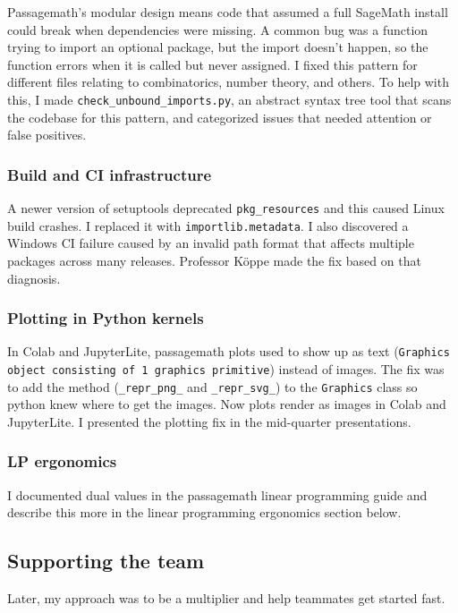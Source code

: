 \documentclass[10pt]{article}
\begin{document}
Passagemath's modular design means code that assumed a full SageMath install could break when dependencies were missing. A common bug was a function trying to import an optional package, but the import doesn't happen, so the function errors when it is called but never assigned. I fixed this pattern for different files relating to combinatorics, number theory, and others. To help with this, I made \texttt{check\_unbound\_imports.py}, an abstract syntax tree tool that scans the codebase for this pattern, and categorized issues that needed attention or false positives.

\subsubsection{Build and CI infrastructure}

A newer version of setuptools deprecated \texttt{pkg\_resources} and this caused Linux build crashes. I replaced it with \texttt{importlib.metadata}. I also discovered a Windows CI failure caused by an invalid path format that affects multiple packages across many releases. Professor Köppe made the fix based on that diagnosis.

\subsubsection{Plotting in Python kernels}

In Colab and JupyterLite, passagemath plots used to show up as text (\texttt{Graphics object consisting of 1 graphics primitive}) instead of images. The fix was to add the method (\texttt{\_repr\_png\_} and \texttt{\_repr\_svg\_}) to the \texttt{Graphics} class so python knew where to get the images. Now plots render as images in Colab and JupyterLite. I presented the plotting fix in the mid-quarter presentations.

\subsubsection{LP ergonomics}

I documented dual values in the passagemath linear programming guide and describe this more in the linear programming ergonomics section below.

\subsection{Supporting the team}

Later, my approach was to be a multiplier and help teammates get started fast.
\end{document}
